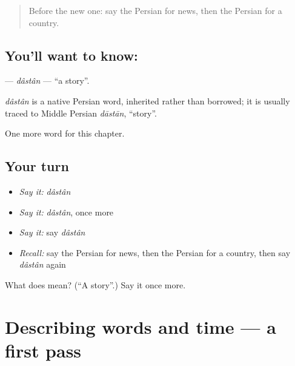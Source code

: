 \label{lesson:FA-C78-dastan}



\begin{quote}
Before the new one: say the Persian for news, then the Persian for a country.
\end{quote}

\subsection*{You'll want to know: }
\textbf{} — \emph{dâstân} — \textquotedblleft{}a story\textquotedblright{}.

\begin{cousinweb}
\emph{dâstân} is a native Persian word, inherited rather than borrowed; it is usually traced to Middle Persian \emph{dāstān}, \textquotedblleft{}story\textquotedblright{}.
\end{cousinweb}

\begin{grammarlens}[title={What you've built}]
One more word for this chapter.
\end{grammarlens}

\subsection*{Your turn}
\begin{itemize}
\raggedright
  \item \emph{Say it:} \emph{dâstân}
  \item \emph{Say it:} \emph{dâstân}, once more
  \item \emph{Say it:} say \emph{dâstân}
  \item \emph{Recall:} say the Persian for news, then the Persian for a country, then say \emph{dâstân} again
\end{itemize}

\begin{tcolorbox}[breakable,colback=teal!4,colframe=teal!35!black,title={Before you move on}]
What does  mean? (\textquotedblleft{}A story\textquotedblright{}.) Say it once more.
\end{tcolorbox}
\section[(dialogue)]{Describing words and time — a first pass}

\label{lesson:FA-R78-first-pass-describing-words-and-time}



